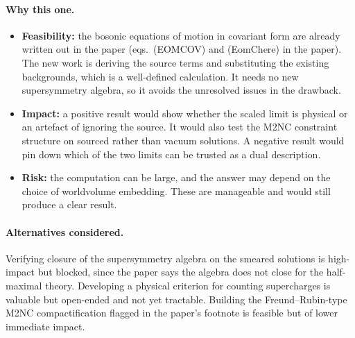 \documentclass[11pt]{article}
\begin{document}
\paragraph{Why this one.}
\begin{itemize}
  \item \textbf{Feasibility:} the bosonic equations of motion in covariant form are already written out in the paper (eqs.~(EOMCOV) and (EomChere) in the paper). The new work is deriving the source terms and substituting the existing backgrounds, which is a well-defined calculation. It needs no new supersymmetry algebra, so it avoids the unresolved issues in the drawback.
  \item \textbf{Impact:} a positive result would show whether the scaled limit is physical or an artefact of ignoring the source. It would also test the M2NC constraint structure on sourced rather than vacuum solutions. A negative result would pin down which of the two limits can be trusted as a dual description.
  \item \textbf{Risk:} the computation can be large, and the answer may depend on the choice of worldvolume embedding. These are manageable and would still produce a clear result.
\end{itemize}

\paragraph{Alternatives considered.} Verifying closure of the supersymmetry algebra on the smeared solutions is high-impact but blocked, since the paper says the algebra does not close for the half-maximal theory. Developing a physical criterion for counting supercharges is valuable but open-ended and not yet tractable. Building the Freund--Rubin-type M2NC compactification flagged in the paper's footnote is feasible but of lower immediate impact.
\end{document}
